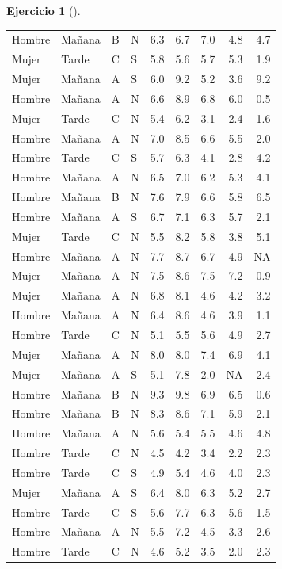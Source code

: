 \documentclass[
  a4paper,
]{scrreport}
\theoremstyle{definition}
\newtheorem{exercise}{Ejercicio}[chapter]
\theoremstyle{remark}
\begin{document}
\begin{exercise}[]
\begin{enumerate}
\begin{tcolorbox}
\begin{longtable}[]{@{}llllrrrrr@{}}
  Hombre & Mañana & B & N & 6.3 & 6.7 & 7.0 & 4.8 & 4.7 \\
  Mujer & Tarde & C & S & 5.8 & 5.6 & 5.7 & 5.3 & 1.9 \\
  Mujer & Mañana & A & S & 6.0 & 9.2 & 5.2 & 3.6 & 9.2 \\
  Hombre & Mañana & A & N & 6.6 & 8.9 & 6.8 & 6.0 & 0.5 \\
  Mujer & Tarde & C & N & 5.4 & 6.2 & 3.1 & 2.4 & 1.6 \\
  Hombre & Mañana & A & N & 7.0 & 8.5 & 6.6 & 5.5 & 2.0 \\
  Hombre & Tarde & C & S & 5.7 & 6.3 & 4.1 & 2.8 & 4.2 \\
  Hombre & Mañana & A & N & 6.5 & 7.0 & 6.2 & 5.3 & 4.1 \\
  Hombre & Mañana & B & N & 7.6 & 7.9 & 6.6 & 5.8 & 6.5 \\
  Hombre & Mañana & A & S & 6.7 & 7.1 & 6.3 & 5.7 & 2.1 \\
  Mujer & Tarde & C & N & 5.5 & 8.2 & 5.8 & 3.8 & 5.1 \\
  Hombre & Mañana & A & N & 7.7 & 8.7 & 6.7 & 4.9 & NA \\
  Mujer & Mañana & A & N & 7.5 & 8.6 & 7.5 & 7.2 & 0.9 \\
  Mujer & Mañana & A & N & 6.8 & 8.1 & 4.6 & 4.2 & 3.2 \\
  Hombre & Mañana & A & N & 6.4 & 8.6 & 4.6 & 3.9 & 1.1 \\
  Hombre & Tarde & C & N & 5.1 & 5.5 & 5.6 & 4.9 & 2.7 \\
  Mujer & Mañana & A & N & 8.0 & 8.0 & 7.4 & 6.9 & 4.1 \\
  Mujer & Mañana & A & S & 5.1 & 7.8 & 2.0 & NA & 2.4 \\
  Hombre & Mañana & B & N & 9.3 & 9.8 & 6.9 & 6.5 & 0.6 \\
  Hombre & Mañana & B & N & 8.3 & 8.6 & 7.1 & 5.9 & 2.1 \\
  Hombre & Mañana & A & N & 5.6 & 5.4 & 5.5 & 4.6 & 4.8 \\
  Hombre & Tarde & C & N & 4.5 & 4.2 & 3.4 & 2.2 & 2.3 \\
  Hombre & Tarde & C & S & 4.9 & 5.4 & 4.6 & 4.0 & 2.3 \\
  Mujer & Mañana & A & S & 6.4 & 8.0 & 6.3 & 5.2 & 2.7 \\
  Hombre & Tarde & C & S & 5.6 & 7.7 & 6.3 & 5.6 & 1.5 \\
  Hombre & Mañana & A & N & 5.5 & 7.2 & 4.5 & 3.3 & 2.6 \\
  Hombre & Tarde & C & N & 4.6 & 5.2 & 3.5 & 2.0 & 2.3 \\

\end{longtable}
\end{tcolorbox}
\end{enumerate}
\end{exercise}
\end{document}
